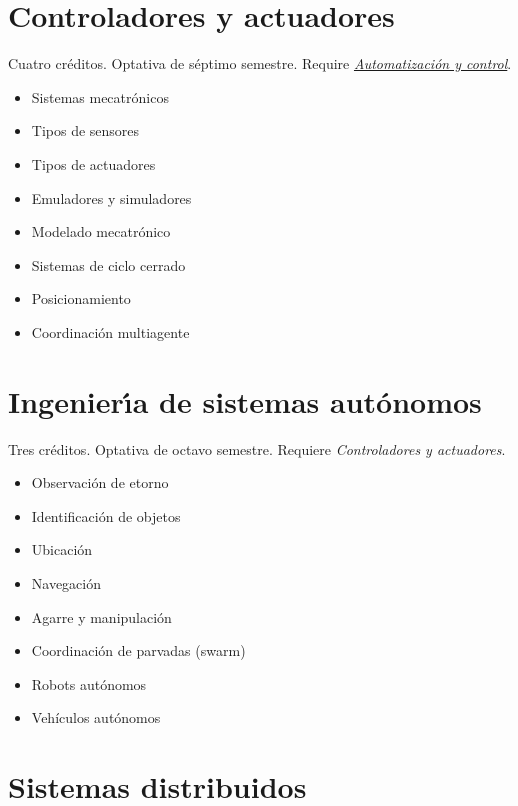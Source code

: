 \documentclass{article}
\begin{document}
\begin{multicols}{4}
\vfill\null \columnbreak


\hypertarget{cya}{\section*{Controladores y actuadores}} 

Cuatro cr\'{e}ditos. Optativa de s\'{e}ptimo semestre. Require
\hyperlink{ayc}{\em Automatizaci\'{o}n y control}.

\begin{itemize}
\item{Sistemas mecatr\'{o}nicos}
\item{Tipos de sensores}
\item{Tipos de actuadores}
\item{Emuladores y simuladores}  
\item{Modelado mecatr\'{o}nico}
\item{Sistemas de ciclo cerrado}
\item{Posicionamiento}
\item{Coordinaci\'{o}n multiagente}
\end{itemize}

\vfill\null \columnbreak

\hypertarget{idsa}{\section*{Ingenier\'{\i}a de sistemas
    aut\'{o}nomos}} Tres cr\'{e}ditos. Optativa de octavo
semestre. Requiere {\em Controladores y actuadores}.

\begin{itemize}
\item{Observaci\'{o}n de etorno}
\item{Identificaci\'{o}n de objetos}
\item{Ubicaci\'{o}n}
\item{Navegaci\'{o}n}
\item{Agarre y manipulaci\'{o}n}
\item{Coordinaci\'{o}n de parvadas (swarm)}
\item{Robots aut\'{o}nomos}
\item{Veh\'{i}culos aut\'{o}nomos}
\end{itemize}

\newpage

\hypertarget{sdi}{\section*{Sistemas distribuidos}} 


\end{multicols}
\end{document}
